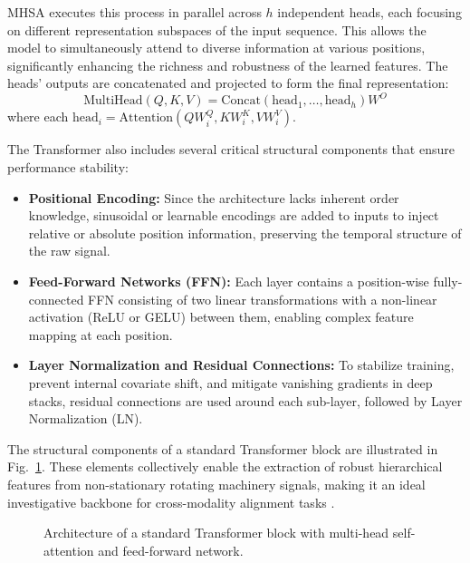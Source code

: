 \documentclass[journal]{IEEEtran}
\begin{document}
MHSA executes this process in parallel across $h$ independent heads, each focusing on different representation subspaces of the input sequence. This allows the model to simultaneously attend to diverse information at various positions, significantly enhancing the richness and robustness of the learned features. The heads' outputs are concatenated and projected to form the final representation:
\begin{equation}
\text{MultiHead}(Q, K, V) = \text{Concat}(\text{head}_1, \dots, \text{head}_h)W^O
\end{equation}
where each $\text{head}_i = \text{Attention}(QW_i^Q, KW_i^K, VW_i^V)$.

The Transformer also includes several critical structural components that ensure performance stability:
\begin{itemize}
    \item \textbf{Positional Encoding:} Since the architecture lacks inherent order knowledge, sinusoidal or learnable encodings are added to inputs to inject relative or absolute position information, preserving the temporal structure of the raw signal.
    \item \textbf{Feed-Forward Networks (FFN):} Each layer contains a position-wise fully-connected FFN consisting of two linear transformations with a non-linear activation (ReLU or GELU) between them, enabling complex feature mapping at each position.
    \item \textbf{Layer Normalization and Residual Connections:} To stabilize training, prevent internal covariate shift, and mitigate vanishing gradients in deep stacks, residual connections are used around each sub-layer, followed by Layer Normalization (LN).
\end{itemize}
The structural components of a standard Transformer block are illustrated in Fig.~\ref{fig:transformer}. These elements collectively enable the extraction of robust hierarchical features from non-stationary rotating machinery signals, making it an ideal investigative backbone for cross-modality alignment tasks \cite{vaswani2017attention}.

\begin{figure}[!t]
\centering
{}
\caption{Architecture of a standard Transformer block with multi-head self-attention and feed-forward network.}
\label{fig:transformer}
\end{figure}
\end{document}
